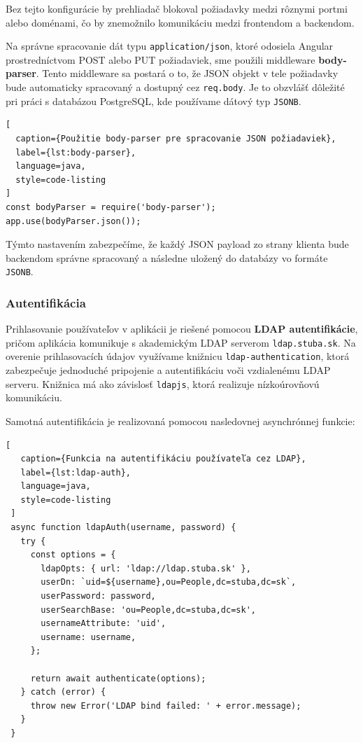 Bez tejto konfigurácie by prehliadač blokoval požiadavky medzi rôznymi portmi alebo doménami, čo by znemožnilo komunikáciu medzi frontendom a backendom.

\bigskip
Na správne spracovanie dát typu \texttt{application/json}, ktoré odosiela Angular prostredníctvom POST alebo PUT požiadaviek, sme použili middleware \textbf{body-parser}. Tento middleware sa postará o to, že JSON objekt v tele požiadavky bude automaticky spracovaný a dostupný cez \texttt{req.body}. Je to obzvlášť dôležité pri práci s databázou PostgreSQL, kde používame dátový typ \texttt{JSONB}.

\begin{lstlisting}[
  caption={Použitie body-parser pre spracovanie JSON požiadaviek},
  label={lst:body-parser},
  language=java,
  style=code-listing
]
const bodyParser = require('body-parser');
app.use(bodyParser.json());
\end{lstlisting}

Týmto nastavením zabezpečíme, že každý JSON payload zo strany klienta bude backendom správne spracovaný a následne uložený do databázy vo formáte \texttt{JSONB}.


 \subsubsection*{Autentifikácia}

 Prihlasovanie používateľov v aplikácii je riešené pomocou \textbf{LDAP autentifikácie}, pričom aplikácia komunikuje s akademickým LDAP serverom \texttt{ldap.stuba.sk}. Na overenie prihlasovacích údajov využívame knižnicu \texttt{ldap-authentication}, ktorá zabezpečuje jednoduché pripojenie a autentifikáciu voči vzdialenému LDAP serveru. Knižnica má ako závislosť \texttt{ldapjs}, ktorá realizuje nízkoúrovňovú komunikáciu.
 
 Samotná autentifikácia je realizovaná pomocou nasledovnej asynchrónnej funkcie:
 
 \begin{lstlisting}[
   caption={Funkcia na autentifikáciu používateľa cez LDAP},
   label={lst:ldap-auth},
   language=java,
   style=code-listing
 ]
 async function ldapAuth(username, password) {
   try {
     const options = {
       ldapOpts: { url: 'ldap://ldap.stuba.sk' },
       userDn: `uid=${username},ou=People,dc=stuba,dc=sk`,
       userPassword: password,
       userSearchBase: 'ou=People,dc=stuba,dc=sk',
       usernameAttribute: 'uid',
       username: username,
     };
 
     return await authenticate(options);
   } catch (error) {
     throw new Error('LDAP bind failed: ' + error.message);
   }
 }
 \end{lstlisting}
 

